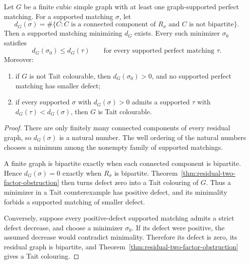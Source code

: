 \begin{theorem}
\label{thm:residual-defect-descent}
Let \(G\) be a finite cubic simple graph with at least one graph-supported
perfect matching.  For a supported matching \(\sigma\), let
\[
 d_G(\sigma)=\#\{C:C\text{ is a connected component of }R_\sigma
                         \text{ and }C\text{ is not bipartite}\}.
\]
Then a supported matching minimizing \(d_G\) exists.  Every such minimizer
\(\sigma_0\) satisfies
\[
 d_G(\sigma_0)\leq d_G(\tau)
 \qquad\text{for every supported perfect matching }\tau.
\]
Moreover:
\begin{enumerate}
\item if \(G\) is not Tait colourable, then \(d_G(\sigma_0)>0\), and no
      supported perfect matching has smaller defect;
\item if every supported \(\sigma\) with \(d_G(\sigma)>0\) admits a supported
      \(\tau\) with \(d_G(\tau)<d_G(\sigma)\), then \(G\) is Tait colourable.
\end{enumerate}
\end{theorem}

\begin{proof}
There are only finitely many connected components of every residual graph,
so \(d_G(\sigma)\) is a natural number.  The well ordering of the natural
numbers chooses a minimum among the nonempty family of supported matchings.

A finite graph is bipartite exactly when each connected component is
bipartite.  Hence \(d_G(\sigma)=0\) exactly when \(R_\sigma\) is bipartite.
Theorem~\ref{thm:residual-two-factor-obstruction} then turns defect zero into
a Tait colouring of \(G\).  Thus a minimizer in a Tait counterexample has
positive defect, and its minimality forbids a supported matching of smaller
defect.

Conversely, suppose every positive-defect supported matching admits a strict
defect decrease, and choose a minimizer \(\sigma_0\).  If its defect were
positive, the assumed decrease would contradict minimality.  Therefore its
defect is zero, its residual graph is bipartite, and
Theorem~\ref{thm:residual-two-factor-obstruction} gives a Tait colouring.
\end{proof}

